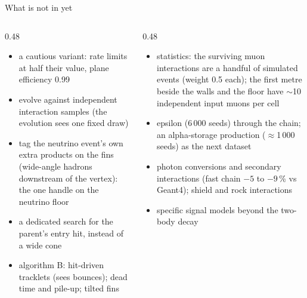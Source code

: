 \documentclass[aspectratio=169,10pt]{beamer}
\begin{document}
\begin{frame}{What is not in yet}
  \begin{columns}[T]
    \begin{column}{0.48\textwidth}\small
      \begin{itemize}\footnotesize
        \item a cautious variant: rate limits at half their value, plane efficiency 0.99
        \item evolve against independent interaction samples (the evolution sees one fixed draw)
      \end{itemize}
      \begin{itemize}\footnotesize
        \item tag the neutrino event's own extra products on the fins (wide-angle hadrons downstream of the vertex): the one handle on the neutrino floor
        \item a dedicated search for the parent's entry hit, instead of a wide cone
        \item algorithm B: hit-driven tracklets (sees bounces); dead time and pile-up; tilted fins
      \end{itemize}
    \end{column}
    \begin{column}{0.48\textwidth}\small
      \begin{itemize}\footnotesize
        \item statistics: the surviving muon interactions are a handful of simulated events (weight 0.5 each); the first metre beside the walls and the floor have $\sim$10 independent input muons per cell
        \item epsilon (6\,000 seeds) through the chain; an alpha-storage production ($\approx$1\,000 seeds) as the next dataset
        \item photon conversions and secondary interactions (fast chain $-5$ to $-9$\,\% vs Geant4); shield and rock interactions
        \item specific signal models beyond the two-body decay
      \end{itemize}
    \end{column}
  \end{columns}
\end{frame}
\end{document}
